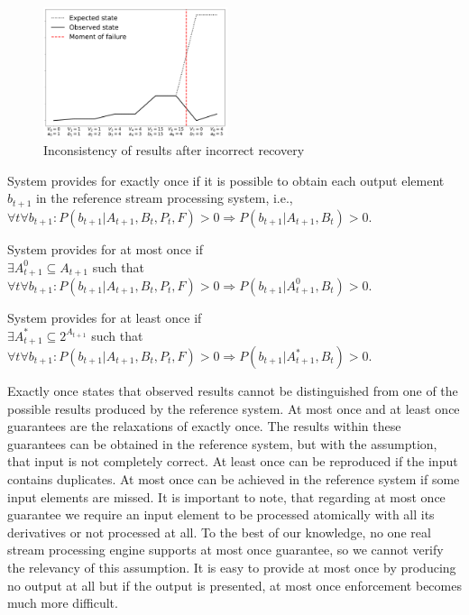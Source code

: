 \begin{figure}[htbp]
  \centering
  \includegraphics[width=0.48\textwidth]{pics/failure}
  \caption{Inconsistency of results after incorrect recovery}
  \label {state-inconsistency}
\end{figure}

\begin{definition}{System provides for exactly once}
if it is possible to obtain each output element $b_{t+1}$ in the reference stream processing system, i.e.,\\ 
$\forall{t} \forall{b_{t+1}}: P(b_{t+1}|A_{t+1},B_t,P_t,F)>0 \Rightarrow P(b_{t+1}|A_{t+1},B_t)>0$.
\end{definition}

\begin{definition}{System provides for at most once}
if \\
$\exists{A^{0}_{t+1}\subseteq{A_{t+1}}}$ such that \\
$\forall{t} \forall{b_{t+1}}: P(b_{t+1}|A_{t+1},B_t,P_t,F)>0 \Rightarrow P(b_{t+1}|A^{0}_{t+1},B_t)>0$.
\end{definition}

\begin{definition}{System provides for at least once}
if \\
$\exists{A^{*}_{t+1}\subseteq{2^{A_{t+1}}}}$ such that \\
$\forall{t} \forall{b_{t+1}}: P(b_{t+1}|A_{t+1},B_t,P_t,F)>0 \Rightarrow P(b_{t+1}|A^{*}_{t+1},B_t)>0$.
\end{definition}

Exactly once states that observed results cannot be distinguished from one of the possible results produced by the reference system. At most once and at least once guarantees are the relaxations of exactly once. The results within these guarantees can be obtained in the reference system, but with the assumption, that input is not completely correct. At least once can be reproduced if the input contains duplicates. At most once can be achieved in the reference system if some input elements are missed. It is important to note, that regarding at most once guarantee we require an input element to be processed atomically with all its derivatives or not processed at all. To the best of our knowledge, no one real stream processing engine supports at most once guarantee, so we cannot verify the relevancy of this assumption. It is easy to provide at most once by producing no output at all but if the output is presented, at most once enforcement becomes much more difficult.  

